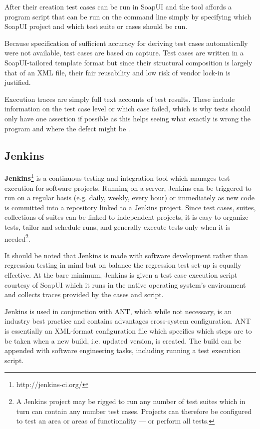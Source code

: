 \documentclass[12pt,a4paper,oneside,pdftex]{report}
\begin{document}
{After their creation test cases can be run in SoapUI and the tool affords a program script that can be run on the command line simply by specifying which SoapUI project and which test suite or cases should be run.

Because specification of sufficient accuracy for deriving test cases automatically were not available, test cases are based on capture. Test cases are written in a SoapUI-tailored template format but since their structural composition is largely that of an XML file, their fair reusability and low risk of vendor lock-in is justified. 

Execution traces are simply full text accounts of test results. These include information on the test case level or which case failed, which is why tests should only have one assertion if possible as this helps seeing what exactly is wrong the program and where the defect might be \citep{duvall2007continuous}.

\subsection{Jenkins}

\textbf{Jenkins}\footnote{http://jenkins-ci.org/} is a continuous testing and integration tool which manages test execution for software projects. Running on a server, Jenkins can be triggered to run on a regular basis (e.g. daily, weekly, every hour) or immediately as new code is committed into a repository linked to a Jenkins project. Since test cases, suites, collections of suites can be linked to independent projects, it is easy to organize tests, tailor and schedule runs, and generally execute tests only when it is needed\footnote{A Jenkins project may be rigged to run any number of test suites which in turn can contain any number test cases. Projects can therefore be configured to test an area or areas of functionality --- or perform all tests.}.

It should be noted that Jenkins is made with software development rather than regression testing in mind but on balance the regression test set-up is equally effective. At the bare minimum, Jenkins is given a test case execution script courtesy of SoapUI which it runs in the native operating system's environment and collects traces provided by the cases and script.

Jenkins is used in conjunction with ANT, which while not necessary, is an industry best practice and contains advantages cross-system configuration. ANT is essentially an XML-format configuration file which specifies which steps are to be taken when a new build, i.e. updated version, is created. The build can be appended with software engineering tasks, including running a test execution script. 

}
\end{document}
